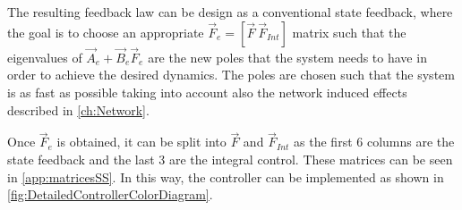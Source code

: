 The resulting feedback law can be design as a conventional state feedback, where the goal is to choose an appropriate $\vec{F}_e=[\vec{F} \ \vec{F}_{Int}]$ matrix such that the eigenvalues of $\vec{A}_e+\vec{B}_e\vec{F}_e$ are the new poles that the system needs to have in order to achieve the desired dynamics. The poles are chosen such that the system is as fast as possible taking into account also the network induced effects described in \autoref{ch:Network}. \cite{ssReference}

Once $\vec{F}_e$ is obtained, it can be split into $\vec{F}$ and $\vec{F}_{Int}$ as the first 6 columns are the state feedback and the last 3 are the integral control. These matrices can be seen in \autoref{app:matricesSS}. In this way, the controller can be implemented as shown in \autoref{fig:DetailedControllerColorDiagram}. \cite{ssReference}


